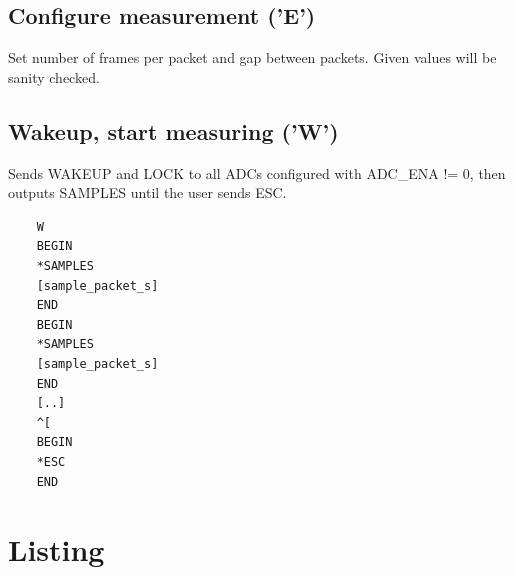 \documentclass{article}
\begin{document}
\subsection{Configure measurement ('E')}

Set number of frames per packet and gap between packets.
Given values will be sanity checked.

\subsection{Wakeup, start measuring ('W')}

Sends WAKEUP and LOCK to all ADCs configured with ADC\_ENA != 0,
then outputs SAMPLES until the user sends ESC.

\begin{lstlisting}
    W
    BEGIN
    *SAMPLES
    [sample_packet_s]
    END
    BEGIN
    *SAMPLES
    [sample_packet_s]
    END
    [..]
    ^[
    BEGIN
    *ESC
    END
\end{lstlisting}


\section{Listing}
\label{sample_packet_s}


\end{document}

